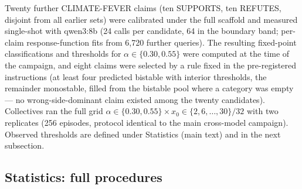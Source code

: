 \documentclass[11pt]{article}
\begin{document}
Twenty further CLIMATE-FEVER claims (ten SUPPORTS, ten REFUTES, disjoint from
all earlier sets) were calibrated under the full scaffold and measured
single-shot with qwen3:8b (24 calls per candidate, 64 in the boundary band;
per-claim response-function fits from 6{,}720 further queries). The resulting
fixed-point classifications and thresholds for $\alpha \in \{0.30, 0.55\}$
were computed at the time of the campaign, and eight claims were selected by
a rule fixed in the pre-registered instructions (at least four predicted bistable with interior
thresholds, the remainder monostable, filled from the bistable pool where a
category was empty --- no wrong-side-dominant claim existed among the twenty
candidates). Collectives ran the full grid $\alpha \in \{0.30, 0.55\} \times
x_0 \in \{2, 6, \ldots, 30\}/32$ with two replicates (256 episodes, protocol
identical to the main cross-model campaign). Observed thresholds are defined
under Statistics (main text) and in the next subsection.

\subsection{Statistics: full procedures}
\end{document}
